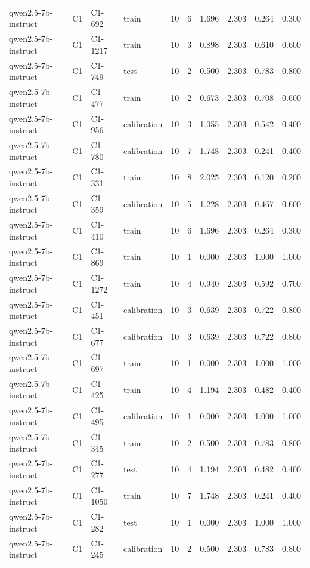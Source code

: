 \begin{table}
\begin{tabular}{llllrrrrrr}
qwen2.5-7b-instruct & C1 & C1-692 & train & 10 & 6 & 1.696 & 2.303 & 0.264 & 0.300 \\
qwen2.5-7b-instruct & C1 & C1-1217 & train & 10 & 3 & 0.898 & 2.303 & 0.610 & 0.600 \\
qwen2.5-7b-instruct & C1 & C1-749 & test & 10 & 2 & 0.500 & 2.303 & 0.783 & 0.800 \\
qwen2.5-7b-instruct & C1 & C1-477 & train & 10 & 2 & 0.673 & 2.303 & 0.708 & 0.600 \\
qwen2.5-7b-instruct & C1 & C1-956 & calibration & 10 & 3 & 1.055 & 2.303 & 0.542 & 0.400 \\
qwen2.5-7b-instruct & C1 & C1-780 & calibration & 10 & 7 & 1.748 & 2.303 & 0.241 & 0.400 \\
qwen2.5-7b-instruct & C1 & C1-331 & train & 10 & 8 & 2.025 & 2.303 & 0.120 & 0.200 \\
qwen2.5-7b-instruct & C1 & C1-359 & calibration & 10 & 5 & 1.228 & 2.303 & 0.467 & 0.600 \\
qwen2.5-7b-instruct & C1 & C1-410 & train & 10 & 6 & 1.696 & 2.303 & 0.264 & 0.300 \\
qwen2.5-7b-instruct & C1 & C1-869 & train & 10 & 1 & 0.000 & 2.303 & 1.000 & 1.000 \\
qwen2.5-7b-instruct & C1 & C1-1272 & train & 10 & 4 & 0.940 & 2.303 & 0.592 & 0.700 \\
qwen2.5-7b-instruct & C1 & C1-451 & calibration & 10 & 3 & 0.639 & 2.303 & 0.722 & 0.800 \\
qwen2.5-7b-instruct & C1 & C1-677 & calibration & 10 & 3 & 0.639 & 2.303 & 0.722 & 0.800 \\
qwen2.5-7b-instruct & C1 & C1-697 & train & 10 & 1 & 0.000 & 2.303 & 1.000 & 1.000 \\
qwen2.5-7b-instruct & C1 & C1-425 & train & 10 & 4 & 1.194 & 2.303 & 0.482 & 0.400 \\
qwen2.5-7b-instruct & C1 & C1-495 & calibration & 10 & 1 & 0.000 & 2.303 & 1.000 & 1.000 \\
qwen2.5-7b-instruct & C1 & C1-345 & train & 10 & 2 & 0.500 & 2.303 & 0.783 & 0.800 \\
qwen2.5-7b-instruct & C1 & C1-277 & test & 10 & 4 & 1.194 & 2.303 & 0.482 & 0.400 \\
qwen2.5-7b-instruct & C1 & C1-1050 & train & 10 & 7 & 1.748 & 2.303 & 0.241 & 0.400 \\
qwen2.5-7b-instruct & C1 & C1-282 & test & 10 & 1 & 0.000 & 2.303 & 1.000 & 1.000 \\
qwen2.5-7b-instruct & C1 & C1-245 & calibration & 10 & 2 & 0.500 & 2.303 & 0.783 & 0.800 \\

\end{tabular}
\end{table}
